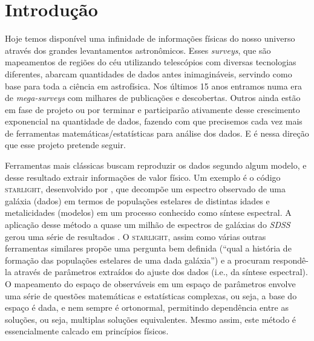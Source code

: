 \documentclass[a4paper,12pt]{article}
\def\starlight{\textsc{starlight}\xspace}      %
\def\SDSS{\textit{SDSS}\xspace}           %
\begin{document}
\section{Introdução}
Hoje temos disponível uma infinidade de informações físicas do nosso universo através dos grandes levantamentos astronômicos. Esses {\em surveys}, que
são mapeamentos de regiões do céu utilizando telescópios com diversas tecnologias diferentes, abarcam quantidades de dados antes inimagináveis,
servindo como base para toda a ciência em astrofísica. Nos últimos 15 anos entramos numa era de {\em mega-surveys} \citep[e.g., \SDSS, 2dFGRS, 2MASS;
][]{York2000, Colless1999, Skrutskie2006} com milhares de publicações e descobertas. Outros ainda estão em fase de projeto \citep[LSST;
][]{Ivezic2008} ou por terminar \citep[JPAS; ][]{Benitez2009} e participarão ativamente desse crescimento exponencial na quantidade de dados, fazendo
com que precisemos cada vez mais de ferramentas matemáticas/estatísticas para análise dos dados. E é nessa direção que esse projeto pretende seguir.
	
Ferramentas mais clássicas buscam reproduzir os dados segundo algum modelo, e desse resultado extrair informações de valor físico. Um exemplo é o
código \starlight, desenvolvido por \citet{CidFernandes2005}, que decompõe um espectro observado de uma galáxia (dados) em termos de populações
estelares de distintas idades e metalicidades (modelos) em um processo conhecido como síntese espectral. A aplicação desse método a quase um milhão de
espectros de galáxias do \SDSS gerou uma série de resultados \citep[e.g., ][]{Asari2007, Asari2009, CidFernandes2007, Mateus2007}. O \starlight, assim
como várias outras ferramentas similares \citep{Panter2003, Gallazzi2005, Ocvirk2006} propõe uma pergunta bem definida (``qual a história de formação
das populações estelares de uma dada galáxia'') e a procuram respondê-la através de parâmetros extraídos do ajuste dos dados (i.e., da síntese
espectral). O mapeamento do espaço de observáveis em um espaço de parâmetros envolve uma série de questões matemáticas e estatísticas complexas, ou
seja, a base do espaço é dada, e nem sempre é ortonormal, permitindo dependência entre as soluções, ou seja, multiplas soluções equivalentes. Mesmo
assim, este método é essencialmente calcado em princípios físicos.
\end{document}

